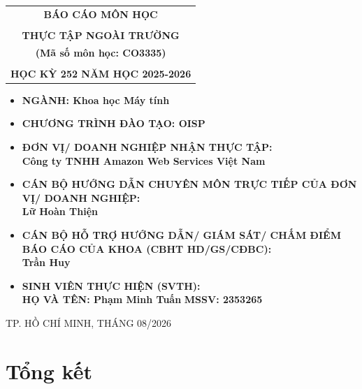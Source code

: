 \documentclass[a4paper,12pt]{article}
\theoremstyle{definition}
\newcommand{\coverbig}{\fontsize{18}{22}\selectfont}
\newcommand{\cover}{\fontsize{15}{19}\selectfont}
\newcommand{\coverlistspacing}{%
  \setlength{\topsep}{0pt}\setlength{\parskip}{0pt}%
  \setlength{\itemsep}{3pt}\setlength{\parsep}{0pt}%
}
\begin{document}
\begin{titlepage}
\begin{center}
\begin{tabular}{c}
\multicolumn{1}{c}{\textbf{{\coverbig BÁO CÁO MÔN HỌC}}}\\
\\{\textbf{{\coverbig THỰC TẬP NGOÀI TRƯỜNG}}}
\\{\textbf{{\coverbig (Mã số môn học: CO3335)}}}
\\
\\
\textbf{\cover HỌC KỲ 252 NĂM HỌC 2025-2026} \\
\end{tabular}
\end{center}
\vspace{0.2cm}
\begin{itemize}
\renewcommand\labelitemi{--}
\coverlistspacing
    \item \cover \textbf{NGÀNH: Khoa học Máy tính}
    \item \cover \textbf{CHƯƠNG TRÌNH ĐÀO TẠO: OISP}
\end{itemize}
\vspace{0.35cm}
\begin{itemize}
\renewcommand\labelitemi{--}
\coverlistspacing
    \item \cover \textbf{ĐƠN VỊ/ DOANH NGHIỆP NHẬN THỰC TẬP:}
    \\ \cover \textbf{Công ty TNHH Amazon Web Services Việt Nam}
    \item \cover \textbf{CÁN BỘ HƯỚNG DẪN CHUYÊN MÔN TRỰC TIẾP CỦA ĐƠN VỊ/ DOANH NGHIỆP:}
    \\ \cover \textbf{Lữ Hoàn Thiện}
    \item \cover \textbf{CÁN BỘ HỖ TRỢ HƯỚNG DẪN/ GIÁM SÁT/ CHẤM ĐIỂM BÁO CÁO CỦA KHOA (CBHT HD/GS/CĐBC):}
    \\ \cover \textbf{Trần Huy}
    \item \cover \textbf{SINH VIÊN THỰC HIỆN (SVTH):}
    \\ \cover \textbf{HỌ VÀ TÊN: Phạm Minh Tuấn} \textbf{MSSV: 2353265}
\end{itemize}
\enlargethispage{1.3cm}
\vfill
\begin{center}
{\cover TP. HỒ CHÍ MINH, THÁNG 08/2026}
\end{center}
\vspace{0.5cm}
\end{titlepage}

\newpage
\tableofcontents
\newpage





\newpage
\section{Tổng kết}

\end{document}
